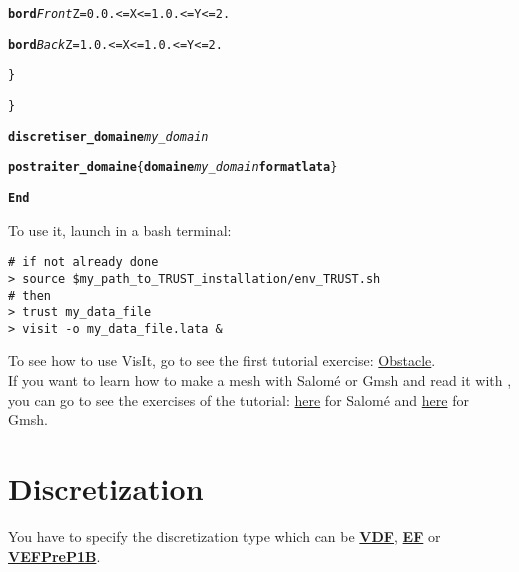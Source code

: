 \begin{center}
{\begin{minipage}[c]{0.8\textwidth}
\begin{alltt}
\hspace{2cm}        {\bf{bord}} \textit{Front}  \hspace{0.25cm} Z = 0. 0. <= X <= 1.  0. <= Y <= 2.

\hspace{2cm}        {\bf{bord}} \textit{Back}   \hspace{0.45cm} Z = 1. 0. <= X <= 1.  0. <= Y <= 2.

\hspace{1cm}    \}

\}

{\bf{discretiser\_domaine}} \textit{my\_domain}

{\bf{postraiter\_domaine}} \{ {\bf{domaine}} \textit{my\_domain} {\bf{format lata}} \}

{\bf{End}}
    \end{alltt}
\end{minipage}}
\end{center}

To use it, launch in a bash terminal:
\begin{verbatim}
# if not already done
> source $my_path_to_TRUST_installation/env_TRUST.sh
# then
> trust my_data_file
> visit -o my_data_file.lata &
\end{verbatim}

To see how to use VisIt, go to see the first \trust tutorial exercise: \href{TRUST_tutorial.pdf\#exo1}{Obstacle}.\\

If you want to learn how to make a mesh with Salom\'e or Gmsh and read it with \trust, you can go to see the exercises of the \trust tutorial: \href{TRUST_tutorial.pdf\#salome}{here} for Salom\'e and \href{TRUST_tutorial.pdf\#gmsh}{here} for Gmsh.







\section{Discretization}
You have to specify the discretization type which can be \href{../../Outils/TRIOXDATA/XTriou/doc.pdf\#vdf}{\textbf{VDF}}, \href{../../Outils/TRIOXDATA/XTriou/doc.pdf\#ef}{\textbf{EF}} or \href{../../Outils/TRIOXDATA/XTriou/doc.pdf\#vefprep1b}{\textbf{VEFPreP1B}}.\\

